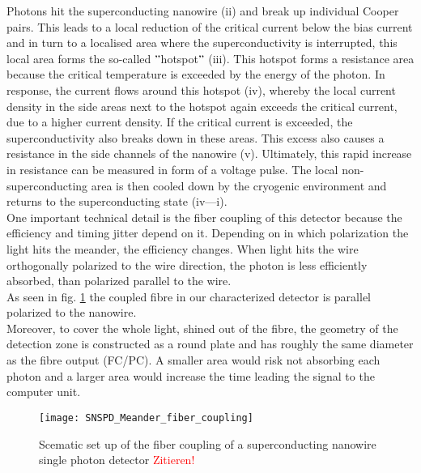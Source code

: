 Photons hit the superconducting nanowire (ii) and break up individual Cooper pairs.
This leads to a local reduction of the critical current below the bias current and in turn to a localised area where
the superconductivity is interrupted, this local area forms the so-called \("\)hotspot\("\) (iii).
This hotspot forms a resistance area because the critical temperature is exceeded by the energy of the photon.
In response, the current flows around this hotspot (iv), whereby the local current density in the side areas next to the
hotspot again exceeds the critical current, due to a higher current density.
If the critical current is exceeded, the superconductivity also breaks down in these areas.
This excess also causes a resistance in the side channels of the nanowire (v).
Ultimately, this rapid increase in resistance can be measured in form of a voltage pulse.
The local non-superconducting area is then cooled down by the cryogenic environment and returns to the superconducting state
(iv—i).\\

One important technical detail is the fiber coupling of this detector because the efficiency
and timing jitter depend on it.
Depending on in which polarization the light hits the meander, the efficiency changes.
When light hits the wire orthogonally polarized to the wire direction, the photon is less efficiently absorbed, than
polarized parallel to the wire. \\ As seen in fig. \ref{fig:SNSPD_fiber_coupling} the coupled fibre in our characterized
detector is parallel polarized to the nanowire.\\
Moreover, to cover the whole light, shined out of the fibre, the geometry of the detection zone is constructed as a
round plate and has roughly the same diameter as the fibre output (FC/PC). A smaller area would risk not absorbing each
photon and a larger area would increase the time leading the signal to the computer unit.

\begin{figure}[hhh]
    \centering
    \texttt{[image: SNSPD\_Meander\_fiber\_coupling]}
    \caption{Scematic set up of the fiber coupling of a superconducting nanowire single photon detector \textcolor{red}{Zitieren!}}
    \label{fig:SNSPD_fiber_coupling}
\end{figure}


